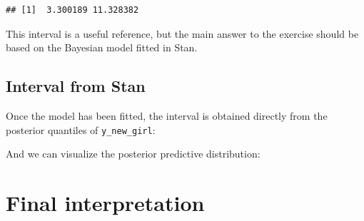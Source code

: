 \documentclass[
  12pt,
]{article}
\newenvironment{Shaded}{\begin{snugshade}}{\end{snugshade}}
\newcommand{\AttributeTok}[1]{\textcolor[rgb]{0.13,0.29,0.53}{#1}}
\newcommand{\DecValTok}[1]{\textcolor[rgb]{0.00,0.00,0.81}{#1}}
\newcommand{\FloatTok}[1]{\textcolor[rgb]{0.00,0.00,0.81}{#1}}
\newcommand{\FunctionTok}[1]{\textcolor[rgb]{0.13,0.29,0.53}{\textbf{#1}}}
\newcommand{\NormalTok}[1]{#1}
\newcommand{\OtherTok}[1]{\textcolor[rgb]{0.56,0.35,0.01}{#1}}
\newcommand{\SpecialCharTok}[1]{\textcolor[rgb]{0.81,0.36,0.00}{\textbf{#1}}}
\newcommand{\StringTok}[1]{\textcolor[rgb]{0.31,0.60,0.02}{#1}}
\begin{document}
\begin{verbatim}
## [1]  3.300189 11.328382
\end{verbatim}

This interval is a useful reference, but the main answer to the exercise
should be based on the Bayesian model fitted in Stan.

\subsection{Interval from Stan}\label{interval-from-stan}

Once the model has been fitted, the interval is obtained directly from
the posterior quantiles of \texttt{y\_new\_girl}:

\begin{Shaded}
\end{Shaded}

And we can visualize the posterior predictive distribution:

\begin{Shaded}
\end{Shaded}

\section{Final interpretation}\label{final-interpretation}
\end{document}
